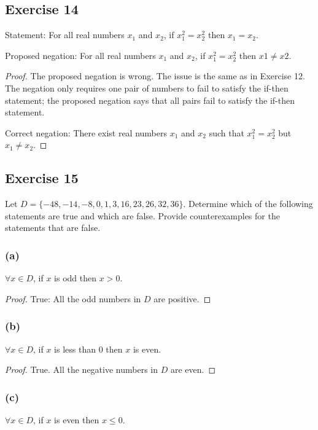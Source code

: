 \documentclass[14pt]{extarticle}
\newcommand{\fa}{\forall}
\begin{document}
\subsection{Exercise 14}
Statement: For all real numbers $x_1$ and $x_2$, if $x_1^2 = x_2^2$ then $x_1 = x_2$.

Proposed negation: For all real numbers $x_1$ and $x_2$, if $x_1^2 = x_2^2$ then $x1 \neq x2$.

\begin{proof}
    The proposed negation is wrong. The issue is the same as in Exercise 12. The negation only requires one pair of numbers to fail to satisfy the if-then statement; the proposed negation says that all pairs fail to satisfy the if-then statement.

    Correct negation: There exist real numbers $x_1$ and $x_2$ such that $x_1^2 = x_2^2$ but $x_1 \neq x_2$.
\end{proof}

\subsection{Exercise 15}
Let $D = \{-48, -14, -8, 0, 1, 3, 16, 23, 26, 32, 36\}$.
Determine which of the following statements are true and which are false. Provide counterexamples for the statements that are false.

\subsubsection{(a)}
$\fa x \in D$, if $x$ is odd then $x > 0$.

\begin{proof}
    True: All the odd numbers in $D$ are positive.
\end{proof}

\subsubsection{(b)}
$\fa x \in D$, if $x$ is less than 0 then $x$ is even.

\begin{proof}
    True. All the negative numbers in $D$ are even.
\end{proof}

\subsubsection{(c)}
$\fa x \in D$, if $x$ is even then $x \leq 0$.
\end{document}
